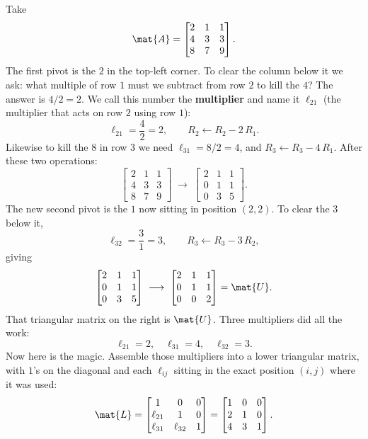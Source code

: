 Take
\[
  \mat{A} = \begin{bmatrix} 2 & 1 & 1 \\ 4 & 3 & 3 \\ 8 & 7 & 9 \end{bmatrix}.
\]
The first pivot is the $2$ in the top-left corner. To clear the column below it we ask:
what multiple of row $1$ must we subtract from row $2$ to kill the $4$? The answer is
$4/2 = 2$. We call this number the \textbf{multiplier} and name it $\ell_{21}$ (the
multiplier that acts on row $2$ using row $1$):
\[
  \ell_{21} = \frac{4}{2} = 2, \qquad
  R_2 \leftarrow R_2 - 2\,R_1.
\]
Likewise to kill the $8$ in row $3$ we need $\ell_{31} = 8/2 = 4$, and
$R_3 \leftarrow R_3 - 4\,R_1$. After these two operations:
\[
  \begin{bmatrix} 2 & 1 & 1 \\ 4 & 3 & 3 \\ 8 & 7 & 9 \end{bmatrix}
  \;\longrightarrow\;
  \begin{bmatrix} 2 & 1 & 1 \\ 0 & 1 & 1 \\ 0 & 3 & 5 \end{bmatrix}.
\]
The new second pivot is the $1$ now sitting in position $(2,2)$. To clear the $3$ below it,
\[
  \ell_{32} = \frac{3}{1} = 3, \qquad R_3 \leftarrow R_3 - 3\,R_2,
\]
giving
\[
  \begin{bmatrix} 2 & 1 & 1 \\ 0 & 1 & 1 \\ 0 & 3 & 5 \end{bmatrix}
  \;\longrightarrow\;
  \begin{bmatrix} 2 & 1 & 1 \\ 0 & 1 & 1 \\ 0 & 0 & 2 \end{bmatrix} = \mat{U}.
\]
That triangular matrix on the right is $\mat{U}$. Three multipliers did all the work:
\[
  \ell_{21} = 2, \quad \ell_{31} = 4, \quad \ell_{32} = 3.
\]
Now here is the magic. Assemble those multipliers into a lower triangular matrix, with
$1$'s on the diagonal and each $\ell_{ij}$ sitting in the exact position $(i,j)$ where it
was used:
\[
  \mat{L} = \begin{bmatrix} 1 & 0 & 0 \\ \ell_{21} & 1 & 0 \\ \ell_{31} & \ell_{32} & 1 \end{bmatrix}
          = \begin{bmatrix} 1 & 0 & 0 \\ 2 & 1 & 0 \\ 4 & 3 & 1 \end{bmatrix}.
\]
